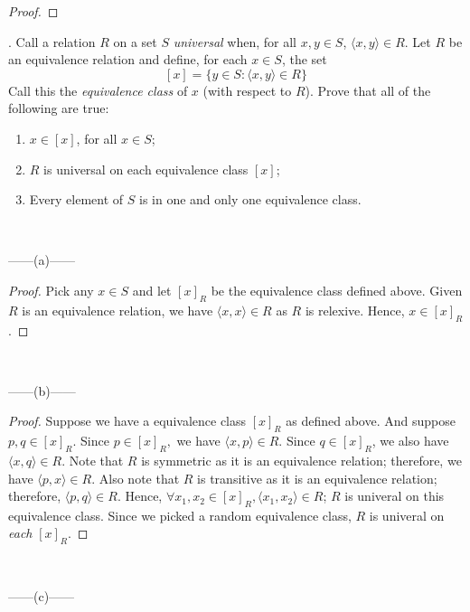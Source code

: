 \documentclass[12pt]{article}
\begin{document}
\begin{proof}
\end{proof}

\newpage
{}. Call a relation $R$ on a set $S$ \emph{universal} when, for all $x, y \in S$, 
$\langle x, y \rangle \in R$. Let $R$ be an equivalence relation and define, for each
$x \in S$, the set 
$$[x] = \{y \in S : \langle x , y \rangle \in R\}$$
\noindent
Call this the \emph{equivalence class} of $x$ (with respect to $R$). Prove that all
of the following are true:
\begin{enumerate}
\renewcommand{\labelenumi}{\alph{enumi}.}
\item $x \in [x]$, for all $x \in S$;
\item $R$ is universal on each equivalence class $[x]$;
\item Every element of $S$ is in one and only one equivalence class.
\end{enumerate}
~~~
\begin{center}
    ------(a)------
\end{center}
\begin{proof}
    Pick any $x \in S$ and let $[x]_R$ be the equivalence class defined above. 
    Given $R$ is an equivalence relation, we have $\langle x,x \rangle \in R$ as $R$ is relexive.
    Hence, $x \in [x]_R$.
\end{proof}
~~~
\begin{center}
    ------(b)------
\end{center}
\begin{proof}
    Suppose we have a equivalence class $[x]_R$ as defined above. And suppose $p, q \in [x]_R$.
    Since $p \in [x]_R,$ we have $\langle x, p \rangle \in R$. Since $q \in [x]_R$, we also have
    $\langle x,q \rangle \in R$. Note that $R$ is symmetric as it is an equivalence relation;
    therefore, we have $\langle p,x \rangle \in R$. Also note that $R$ is transitive as it is an
    equivalence relation; therefore, $\langle p,q \rangle \in R$. Hence, $\forall x_1, x_2 \in [x]_R, 
    \langle x_1, x_2 \rangle \in R$; $R$ is univeral on this equivalence class. Since we picked a
    random equivalence class, $R$ is univeral on \emph{each} $[x]_R$.
\end{proof}
~~~
\begin{center}
    ------(c)------
\end{center}
\end{document}
